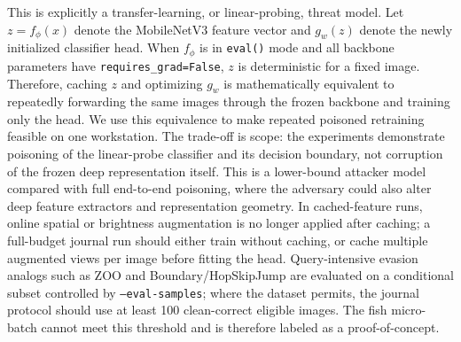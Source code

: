﻿\documentclass[6p,10pt,times]{ieeeaccess}
\begin{document}
This is explicitly a transfer-learning, or linear-probing, threat model. Let \(z=f_\phi(x)\) denote the MobileNetV3 feature vector and \(g_w(z)\) denote the newly initialized classifier head. When \(f_\phi\) is in \texttt{eval()} mode and all backbone parameters have \texttt{requires\_grad=False}, \(z\) is deterministic for a fixed image. Therefore, caching \(z\) and optimizing \(g_w\) is mathematically equivalent to repeatedly forwarding the same images through the frozen backbone and training only the head. We use this equivalence to make repeated poisoned retraining feasible on one workstation. The trade-off is scope: the experiments demonstrate poisoning of the linear-probe classifier and its decision boundary, not corruption of the frozen deep representation itself. This is a lower-bound attacker model compared with full end-to-end poisoning, where the adversary could also alter deep feature extractors and representation geometry. In cached-feature runs, online spatial or brightness augmentation is no longer applied after caching; a full-budget journal run should either train without caching, or cache multiple augmented views per image before fitting the head. Query-intensive evasion analogs such as ZOO and Boundary/HopSkipJump are evaluated on a conditional subset controlled by \texttt{--eval-samples}; where the dataset permits, the journal protocol should use at least 100 clean-correct eligible images. The fish micro-batch cannot meet this threshold and is therefore labeled as a proof-of-concept.
\end{document}
